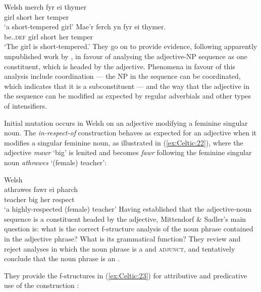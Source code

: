 \documentclass[output=paper,colorlinks,citecolor=brown]{langscibook}
\begin{document}
\ea\label{ex:Celtic:21} Welsh \citep[9]{MittSadl08}
\ea
\gll merch fyr ei thymer\\
girl  short her temper\\
\glt`a short-tempered girl'
\ex
\gll Mae'r ferch  yn fyr ei thymer.\\
{be.\PRS.\textsc{def}} girl  {\PRED} short her temper\\
\glt`The girl is short-tempered.'
\z\z
They go on to provide evidence, following apparently unpublished work by \citet{Jones2002}, in favour of analysing the adjective-NP sequence as one constituent, which is headed by the adjective. Phenomena in favour of this analysis include coordination --- the NP in the sequence can be coordinated, which indicates that it is a subconstituent \citep[3]{MittSadl08} --- and the way that the adjective in the sequence can be modified as expected by regular adverbials and other types of intensifiers.

Initial mutation occurs in Welsh on an adjective modifying a feminine singular noun. The \emph{in-respect-of} construction behaves as expected for an adjective when it modifies a singular feminine noun, as illustrated in (\ref{ex:Celtic:22}), where the adjective \emph{mawr} `big' is lenited and becomes \emph{fawr} following the feminine singular noun \emph{athrawes} `(female) teacher':

\ea\label{ex:Celtic:22} Welsh \citep[6]{MittSadl08}\\
\gll athrawes fawr ei pharch\\
teacher big her respect\\
\glt`a highly-respected (female) teacher'
\z
Having established that the adjective-noun sequence is a constituent headed by the adjective, Mittendorf \& Sadler's main question is: what is the correct f-structure analysis of the noun phrase contained in the adjective phrase? What is its grammatical function? They review and reject analyses in which the noun phrase is a \SUBJ and \textsc{adjunct}, and tentatively conclude that the noun phrase is an \OBJ.

They provide the f-structures in (\ref{ex:Celtic:23}) for attributive and predicative use of the construction \citep[12]{MittSadl08}:
\end{document}
